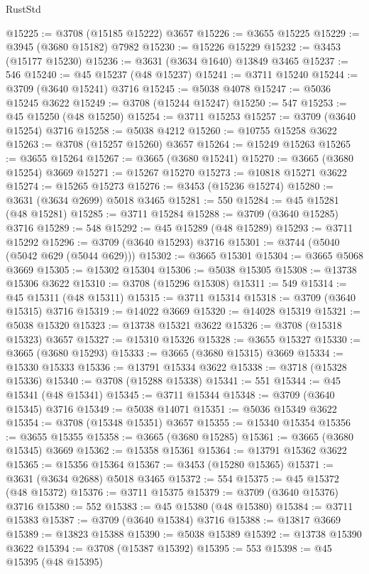 \begin{lexlean}{RustStd}
\begin{coremodule}
@15225 := @3708 (@15185 @15222) @3657
@15226 := @3655 @15225
@15229 := @3945 (@3680 @15182) @7982
@15230 := @15226 @15229
@15232 := @3453 (@15177 @15230)
@15236 := @3631 (@3634 @1640) @13849 @3465
@15237 := 546
@15240 := @45 @15237 (@48 @15237)
@15241 := @3711 @15240
@15244 := @3709 (@3640 @15241) @3716
@15245 := @5038 @4078
@15247 := @5036 @15245 @3622
@15249 := @3708 (@15244 @15247)
@15250 := 547
@15253 := @45 @15250 (@48 @15250)
@15254 := @3711 @15253
@15257 := @3709 (@3640 @15254) @3716
@15258 := @5038 @4212
@15260 := @10755 @15258 @3622
@15263 := @3708 (@15257 @15260) @3657
@15264 := @15249 @15263
@15265 := @3655 @15264
@15267 := @3665 (@3680 @15241)
@15270 := @3665 (@3680 @15254) @3669
@15271 := @15267 @15270
@15273 := @10818 @15271 @3622
@15274 := @15265 @15273
@15276 := @3453 (@15236 @15274)
@15280 := @3631 (@3634 @2699) @5018 @3465
@15281 := 550
@15284 := @45 @15281 (@48 @15281)
@15285 := @3711 @15284
@15288 := @3709 (@3640 @15285) @3716
@15289 := 548
@15292 := @45 @15289 (@48 @15289)
@15293 := @3711 @15292
@15296 := @3709 (@3640 @15293) @3716
@15301 := @3744 (@5040 (@5042 @629 (@5044 @629)))
@15302 := @3665 @15301
@15304 := @3665 @5068 @3669
@15305 := @15302 @15304
@15306 := @5038 @15305
@15308 := @13738 @15306 @3622
@15310 := @3708 (@15296 @15308)
@15311 := 549
@15314 := @45 @15311 (@48 @15311)
@15315 := @3711 @15314
@15318 := @3709 (@3640 @15315) @3716
@15319 := @14022 @3669
@15320 := @14028 @15319
@15321 := @5038 @15320
@15323 := @13738 @15321 @3622
@15326 := @3708 (@15318 @15323) @3657
@15327 := @15310 @15326
@15328 := @3655 @15327
@15330 := @3665 (@3680 @15293)
@15333 := @3665 (@3680 @15315) @3669
@15334 := @15330 @15333
@15336 := @13791 @15334 @3622
@15338 := @3718 (@15328 @15336)
@15340 := @3708 (@15288 @15338)
@15341 := 551
@15344 := @45 @15341 (@48 @15341)
@15345 := @3711 @15344
@15348 := @3709 (@3640 @15345) @3716
@15349 := @5038 @14071
@15351 := @5036 @15349 @3622
@15354 := @3708 (@15348 @15351) @3657
@15355 := @15340 @15354
@15356 := @3655 @15355
@15358 := @3665 (@3680 @15285)
@15361 := @3665 (@3680 @15345) @3669
@15362 := @15358 @15361
@15364 := @13791 @15362 @3622
@15365 := @15356 @15364
@15367 := @3453 (@15280 @15365)
@15371 := @3631 (@3634 @2688) @5018 @3465
@15372 := 554
@15375 := @45 @15372 (@48 @15372)
@15376 := @3711 @15375
@15379 := @3709 (@3640 @15376) @3716
@15380 := 552
@15383 := @45 @15380 (@48 @15380)
@15384 := @3711 @15383
@15387 := @3709 (@3640 @15384) @3716
@15388 := @13817 @3669
@15389 := @13823 @15388
@15390 := @5038 @15389
@15392 := @13738 @15390 @3622
@15394 := @3708 (@15387 @15392)
@15395 := 553
@15398 := @45 @15395 (@48 @15395)

\end{coremodule}
\end{lexlean}
